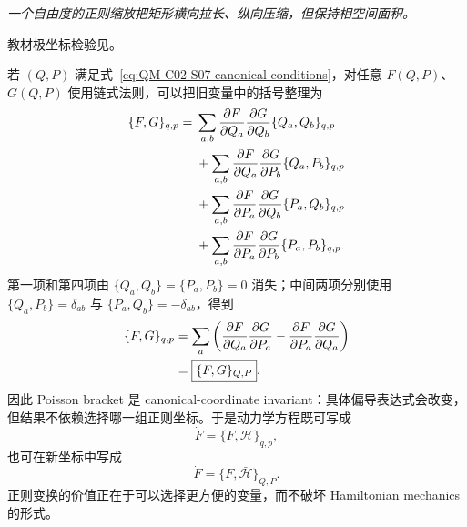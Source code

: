 \begin{center}

\textit{一个自由度的正则缩放把矩形横向拉长、纵向压缩，但保持相空间面积。}
\end{center}

教材极坐标检验见。


若 $(Q,P)$ 满足式~\eqref{eq:QM-C02-S07-canonical-conditions}，对任意 $F(Q,P)$、$G(Q,P)$ 使用链式法则，可以把旧变量中的括号整理为
\begin{align}
  \{F,G\}_{q,p}
  ={}&\sum_{a,b}
    \frac{\partial F}{\partial Q_a}
    \frac{\partial G}{\partial Q_b}
    \{Q_a,Q_b\}_{q,p} \notag\\
  &+\sum_{a,b}
    \frac{\partial F}{\partial Q_a}
    \frac{\partial G}{\partial P_b}
    \{Q_a,P_b\}_{q,p} \notag\\
  &+\sum_{a,b}
    \frac{\partial F}{\partial P_a}
    \frac{\partial G}{\partial Q_b}
    \{P_a,Q_b\}_{q,p} \notag\\
  &+\sum_{a,b}
    \frac{\partial F}{\partial P_a}
    \frac{\partial G}{\partial P_b}
    \{P_a,P_b\}_{q,p}.
  \label{eq:QM-C02-S07-bracket-chain-expansion}
\end{align}
第一项和第四项由 $\{Q_a,Q_b\}=\{P_a,P_b\}=0$ 消失；中间两项分别使用 $\{Q_a,P_b\}=\delta_{ab}$ 与 $\{P_a,Q_b\}=-\delta_{ab}$，得到
\begin{align}
  \{F,G\}_{q,p}
  &=\sum_a\left(
    \frac{\partial F}{\partial Q_a}
    \frac{\partial G}{\partial P_a}
    -
    \frac{\partial F}{\partial P_a}
    \frac{\partial G}{\partial Q_a}
  \right) \notag\\
  &=\boxed{\{F,G\}_{Q,P}}.
  \label{eq:QM-C02-S07-poisson-invariance}
\end{align}
因此 Poisson bracket 是 canonical-coordinate invariant：具体偏导表达式会改变，但结果不依赖选择哪一组正则坐标。于是动力学方程既可写成
\[
  \dot F=\{F,\mathcal H\}_{q,p},
\]
也可在新坐标中写成
\[
  \dot F=\{F,\bar{\mathcal H}\}_{Q,P}.
\]
正则变换的价值正在于可以选择更方便的变量，而不破坏 Hamiltonian mechanics 的形式。

